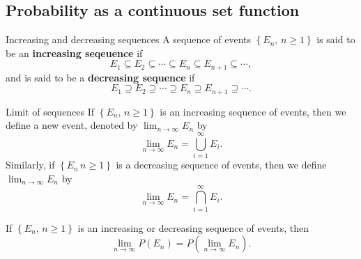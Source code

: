 \subsection{Probability as a continuous set function}
\begin{bdef}{Increasing and decreasing sequences}\label{increasingdecreasing}
    A sequence of events $\left\{ E_n, \, n \geq 1 \right\}$ is said to be an \textbf{increasing seqeuence} if \[
        E_1 \subseteq E_2 \subseteq \cdots \subseteq E_n \subseteq E_{n+1} \subseteq \cdots,    
    \] and is said to be a \textbf{decreasing sequence} if \[
        E_1 \supseteq E_2 \supseteq \cdots \supseteq E_n \supseteq E_{n+1} \supseteq \cdots.
    \]
\end{bdef}
\begin{bdef}{Limit of sequences}\label{limitsequences}
    If $\left\{ E_n, \, n \geq 1 \right\}$ is an increasing sequence of events, then we define a new event, denoted by $\displaystyle \lim_{n \to \infty} E_n$ by \[
        \lim_{n \to \infty} E_n = \bigcup^\infty_{i = 1} E_i.    
    \] Similarly, if $\left\{ E_n \, n \geq 1 \right\}$ is a decreasing sequence of events, then we define $\displaystyle \lim_{n \to \infty} E_n$ by \[
        \lim_{n \to \infty} E_n = \bigcap^\infty_{i = 1} E_i.    
    \]
\end{bdef}
\begin{proposition}\label{limitequiv}
    If $\left\{ E_n, \, n \geq 1 \right\}$ is an increasing or decreasing sequence of events, then \[
        \lim_{n \to \infty} P(E_n) = P\left(\lim_{n \to \infty} E_n\right).    
    \]
\end{proposition}
